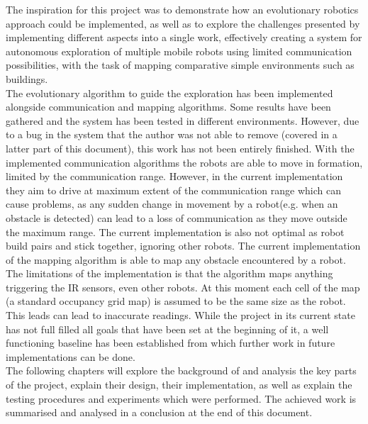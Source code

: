 The inspiration for this project was to demonstrate how an evolutionary robotics approach could be implemented, as well as to explore the challenges presented by implementing different aspects into a single work, effectively creating a system for autonomous exploration of multiple mobile robots using limited communication possibilities, with the task of mapping comparative simple environments such as buildings. \\

The evolutionary algorithm to guide the exploration has been implemented alongside communication and mapping algorithms. 
Some results have been gathered and the system has been tested in different environments. However, due to a bug in the system that the author was not able to remove (covered in a latter part of this document), this work has not been entirely finished.
With the implemented communication algorithms the robots are able to move in formation, limited by the communication range. However, in the current implementation they aim to drive at maximum extent of the communication range which can cause problems, as any sudden change in movement by a robot(e.g. when an obstacle is detected) can lead to a loss of communication as they move outside the maximum range.
The current implementation is also not optimal as robot build pairs and stick together, ignoring other robots.
The current implementation of the mapping algorithm is able to map any obstacle encountered by a robot. The limitations of the implementation is that the algorithm maps anything triggering the IR sensors, even other robots. At this moment each cell of the map (a standard occupancy grid map) is assumed to be the same size as the robot. This leads can lead to inaccurate readings.
While the project in its current state has not full filled all goals that have been set at the beginning of it, a well functioning baseline has been established from which further work in future implementations can be done.\\ 

The following chapters will explore the background of and analysis the key parts of the project, explain their design, their implementation, as well as explain the testing procedures and experiments which were performed. The achieved work is summarised and analysed in a conclusion at the end of this document.\\


